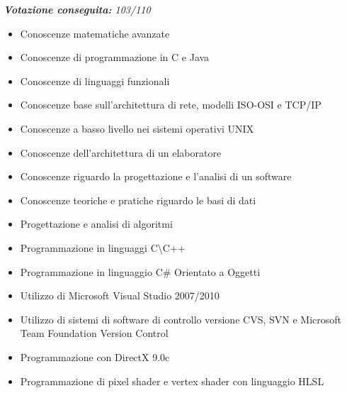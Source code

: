 \documentclass[11pt,a4paper,sans]{moderncv} %
\begin{document}
{
	\newline{}
	\textit{\textbf{Votazione conseguita:} 103/110}
}
{
	\begin{itemize}
		\item Conoscenze matematiche avanzate
		\item Conoscenze di programmazione in C e Java
		\item Conoscenze di linguaggi funzionali
		\item Conoscenze base sull'architettura di rete, modelli ISO-OSI e TCP/IP
		\item Conoscenze a basso livello nei sistemi operativi UNIX
		\item Conoscenze dell'architettura di un elaboratore
		\item Conoscenze riguardo la progettazione e l'analisi di un software
		\item Conoscenze teoriche e pratiche riguardo le basi di dati
		\item Progettazione e analisi di algoritmi
	\end{itemize}
}


{
	\begin{itemize}
		\item Programmazione in linguaggi C\textbackslash C++
		\item Programmazione in linguaggio C\# Orientato a Oggetti
		\item Utilizzo di Microsoft Visual Studio 2007/2010
		\item Utilizzo di sistemi di software di controllo versione CVS, SVN e Microsoft Team Foundation Version Control
		\item Programmazione con DirectX 9.0c
		\item Programmazione di pixel shader e vertex shader con linguaggio HLSL
	\end{itemize}
}
\end{document}
